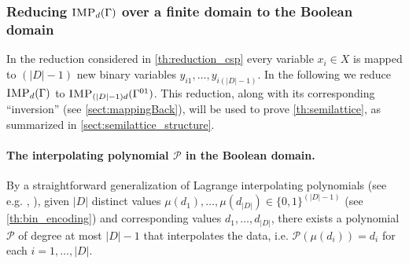 \documentclass[11pt]{article}
\newcommand{\IMP}{\textsc{IMP}}
\newcommand{\1}{\textbf{1}}
\newcommand\p{\mathcal{P}}
\newcommand\uval{{(|D|-1)}}
\begin{document}
\subsubsection[Reducing IMPd(Gamma) over a finite domain to the Boolean domain]{Reducing $\IMP_{d}(\Gamma)$ over a finite domain to the Boolean domain} \label{sect:2Bool}
%
In the reduction considered in \cref{th:reduction_csp}  every variable $x_i\in X$ is mapped to $\uval$ new binary variables $y_{i1},\ldots, y_{i\uval}$.
%
In the following we reduce $\IMP_{d}(\Gamma)$ to $\IMP_{\uval d}(\Gamma^{01})$. This reduction, along with its corresponding ``inversion'' (see \cref{sect:mappingBack}), will be used to prove \cref{th:semilattice}, as summarized in \cref{sect:semilattice_structure}.

\paragraph{The interpolating polynomial $\p$ in the Boolean domain.} 
By a straightforward generalization of Lagrange interpolating polynomials (see e.g. \cite{phillips2003interpolation}, \cite{Gasca2000-hx}), given $|D|$ distinct values  $\mu(d_1),\ldots,\mu(d_{|D|})\in \{0,1\}^{\uval}$ (see \cref{th:bin_encoding}) and corresponding values $d_1,\ldots, d_{|D|}$, there exists a polynomial $\p$ of degree at most $|D|-1$ that interpolates the data, i.e. $\p(\mu(d_i))=d_i$ for each $i=1,\ldots,|D|$.
\end{document}
